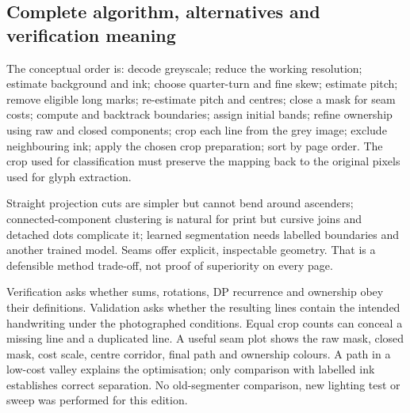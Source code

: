 \subsection{Complete algorithm, alternatives and verification meaning}
The conceptual order is: decode greyscale; reduce the working resolution;
estimate background and ink; choose quarter-turn and fine skew; estimate pitch;
remove eligible long marks; re-estimate pitch and centres; close a mask for
seam costs; compute and backtrack boundaries; assign initial bands; refine
ownership using raw and closed components; crop each line from the grey image;
exclude neighbouring ink; apply the chosen crop preparation; sort by page order.
The crop used for classification must preserve the mapping back to the original
pixels used for glyph extraction.

Straight projection cuts are simpler but cannot bend around ascenders;
connected-component clustering is natural for print but cursive joins and
detached dots complicate it; learned segmentation needs labelled boundaries
and another trained model. Seams offer explicit, inspectable geometry.
That is a defensible method trade-off, not proof of superiority on every page.

Verification asks whether sums, rotations, DP recurrence and ownership obey
their definitions. Validation asks whether the resulting lines contain the
intended handwriting under the photographed conditions. Equal crop counts
can conceal a missing line and a duplicated line. A useful seam plot shows
the raw mask, closed mask, cost scale, centre corridor, final path and ownership
colours. A path in a low-cost valley explains the optimisation; only comparison
with labelled ink establishes correct separation. No old-segmenter comparison,
new lighting test or sweep was performed for this edition.
